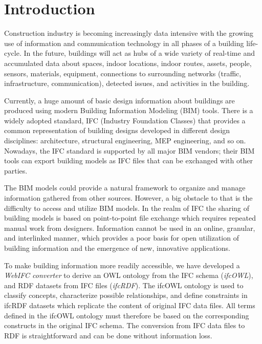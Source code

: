 \section{Introduction}
\label{sec:Introduction}

Construction industry is becoming increasingly data intensive with the growing use of
information and communication technology in all phases of a building life-cycle. 
In the future, buildings will act as hubs of a wide variety of real-time and accumulated data about
spaces, indoor locations, indoor routes, assets, people, sensors, materials, equipment, connections
to surrounding networks (traffic, infrastructure, communication), detected issues, and activities in the building.

Currently, a huge amount of basic design information about buildings are produced  
using modern Building Information Modeling (BIM) tools. There is a widely adopted standard, 
IFC (Industry Foundation Classes) that provides a common representation of building designs developed in different design disciplines: architecture, structural engineering,
MEP engineering, and so on. Nowadays, the IFC standard is supported by all major BIM
vendors; their BIM tools can export building models as IFC files that can be exchanged with other
parties.

The BIM models could provide a natural framework to organize and manage information gathered from other sources. However, a big obstacle to that is the difficulty to access and utilize BIM models. 
In the realm of IFC the sharing of building models is based on point-to-point file exchange which 
requires repeated manual work from designers. Information cannot be used in an online, granular, and interlinked manner, which provides a poor basis for open utilization of building information and the emergence of new, innovative applications.

To make building information more readily accessible, we have developed a \emph{WebIFC converter} to derive an OWL ontology from the IFC schema (\emph{ifcOWL}), and RDF datasets from IFC files (\emph{ifcRDF}). The ifcOWL ontology is used to classify concepts, characterize possible relationships, and define constraints in ifcRDF datasets which replicate the content of original IFC data files. All terms defined in the ifcOWL ontology must therefore be based on the corresponding constructs in the original IFC schema. The conversion from IFC data files to RDF is straightforward and can be done without information loss.

